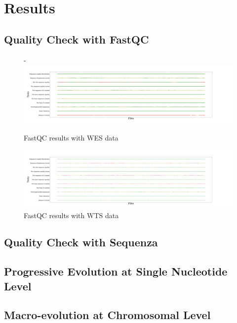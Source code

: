 \documentclass[a4paper]{article}
\begin{document}
    \section{Results}
        \subsection{Quality Check with FastQC}

            \begin{figure}[ht]
                \centering-
               \includegraphics[width=0.8 \linewidth]{figures/FastQC/FastQC_WES.pdf}
                \caption{FastQC results  with WES data}
                \label{fig:fastqc-wes}
            \end{figure}

            \begin{figure}[ht]
                \centering
                \includegraphics[width=0.8 \linewidth]{figures/FastQC/FastQC_WTS.pdf}
                \caption{FastQC results with WTS data}
                \label{fig:fastqc-wts}
            \end{figure}

        \subsection{Quality Check with Sequenza}

        \subsection{Progressive Evolution at Single Nucleotide Level}

        \subsection{Macro-evolution at Chromosomal Level}
\end{document}

